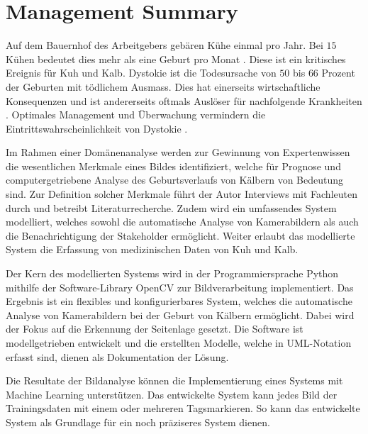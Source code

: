 

\chapter{Management Summary}

Auf dem Bauernhof des Arbeitgebers gebären Kühe einmal pro Jahr. Bei $15$ Kühen bedeutet dies mehr als eine Geburt pro Monat \citep{Muller2019}. Diese ist ein kritisches Ereignis für Kuh und Kalb. \gls{Dystokie} ist die Todesursache von $50$ bis $66$ Prozent der Geburten mit tödlichem Ausmass. Dies hat einerseits wirtschaftliche Konsequenzen \citep[S. 1]{Saint-Dizier2015} und ist andererseits oftmals Auslöser für nachfolgende Krankheiten \citep[S. 1]{Lange2017}.  Optimales Management und Überwachung vermindern die Eintrittswahrscheinlichkeit von Dystokie \citep[S. 1]{Lange2017}. 

Im Rahmen einer Domänenanalyse werden zur Gewinnung von Expertenwissen die wesentlichen Merkmale eines Bildes  identifiziert, welche für Prognose und computergetriebene Analyse des Geburtsverlaufs von Kälbern von Bedeutung sind. Zur Definition solcher Merkmale führt der Autor Interviews mit Fachleuten durch und betreibt Literaturrecherche. Zudem wird ein umfassendes System modelliert, welches sowohl die automatische Analyse von Kamerabildern als auch die Benachrichtigung der Stakeholder ermöglicht. Weiter erlaubt das modellierte System die Erfassung von medizinischen Daten von Kuh und Kalb.

Der Kern des modellierten Systems wird in der Programmiersprache Python mithilfe der Software-Library OpenCV zur Bildverarbeitung implementiert. Das Ergebnis ist ein flexibles und konfigurierbares System, welches die automatische Analyse von Kamerabildern bei der Geburt von Kälbern ermöglicht. Dabei wird der Fokus auf die Erkennung der Seitenlage gesetzt. Die Software ist modellgetrieben entwickelt und die erstellten Modelle, welche in UML-Notation erfasst sind, dienen als Dokumentation der Lösung.

Die Resultate der Bildanalyse können die Implementierung eines Systems mit Machine Learning unterstützen. Das entwickelte System kann jedes Bild der Trainingsdaten mit einem oder mehreren \flqq Tags\frqq markieren. So kann das entwickelte System als Grundlage für ein noch präziseres System dienen.

